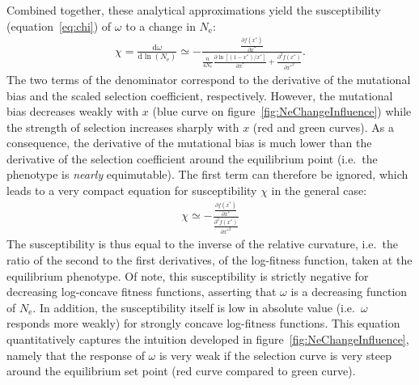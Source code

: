 \documentclass[authoryear]{elsarticle} %
\newcommand{\der}{\mathrm{d}} %
\newcommand{\Ne}{N_{\text{e}}} %
\newcommand{\logfit}{f} %
\newcommand{\eq}{^{*}} %
\newcommand{\NbrSites}{n} %
\begin{document}
Combined together, these analytical approximations yield the susceptibility (equation~\ref{eq:chi}) of $\omega$ to a change in $\Ne$:
\begin{gather}
    \chi = \frac{ \der \omega}{\der \ln (\Ne)} \simeq - \frac{\frac{ \partial \logfit (x\eq) }{\partial {x\eq}}}{\frac{\NbrSites}{4 \Ne} \frac{\partial \ln [ (1 - x\eq) / x\eq ]}{\partial x\eq } + \frac{ \partial^2 \logfit (x\eq) }{\partial {x\eq}^2}}.
\end{gather}
The two terms of the denominator correspond to the derivative of the mutational bias and the scaled selection coefficient, respectively.
However, the mutational bias decreases weakly with $x$ (blue curve on figure~\ref{fig:NeChangeInfluence}) while the strength of selection increases sharply with $x$ (red and green curves).
As a consequence, the derivative of the mutational bias is much lower than the derivative of the selection coefficient around the equilibrium point (i.e.~the {phenotype} is \textit{nearly} equimutable).
The first term can therefore be ignored, which leads to a very compact equation for susceptibility $\chi$ in the general case:
\begin{gather}
    \chi \simeq - \frac{\frac{ \partial \logfit (x\eq) }{\partial {x\eq}}}{\frac{ \partial^2 \logfit (x\eq) }{\partial {x\eq}^2}}
\end{gather}
The susceptibility is thus equal to the inverse of the relative curvature, i.e.~the ratio of the second to the first derivatives, of the log-fitness function, taken at the equilibrium {phenotype}.
Of note, this susceptibility is strictly negative for decreasing log-concave fitness functions, asserting that $\omega$ is a decreasing function of $\Ne$.
In addition, the susceptibility itself is low in absolute value (i.e.~$\omega$ responds more weakly) for strongly concave log-fitness functions.
This equation quantitatively captures the intuition developed in figure~\ref{fig:NeChangeInfluence}, namely that the response of $\omega$ is very weak if the selection curve is very steep around the equilibrium set point (red curve compared to green curve).
\end{document}
